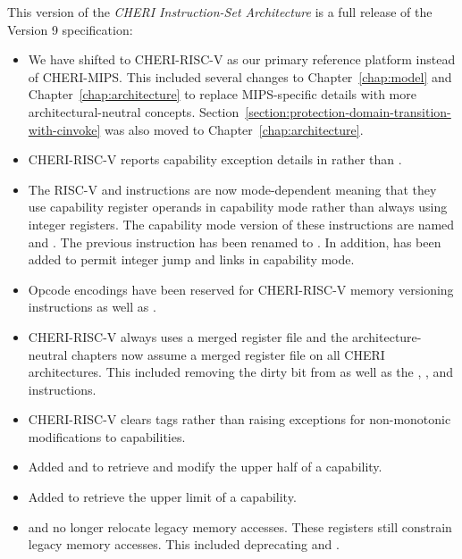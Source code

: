 This version of the \textit{CHERI Instruction-Set Architecture} is a full
release of the Version 9 specification:

\begin{itemize}
\item We have shifted to CHERI-RISC-V as our primary reference
  platform instead of CHERI-MIPS.  This included several changes to
  Chapter~\ref{chap:model} and Chapter~\ref{chap:architecture} to
  replace MIPS-specific details with more architectural-neutral
  concepts.
  Section~\ref{section:protection-domain-transition-with-cinvoke} was
  also moved to Chapter~\ref{chap:architecture}.

\item CHERI-RISC-V reports capability exception details in \xtval{}
  rather than \xccsr{}.

\item The RISC-V  and  instructions are
  now mode-dependent meaning that they use capability register
  operands in capability mode rather than always using integer
  registers.  The capability mode version of these instructions are
  named  and .  The previous
   instruction has been renamed to
  .  In addition,  has been added
  to permit integer jump and links in capability mode.

\item Opcode encodings have been reserved for CHERI-RISC-V memory
  versioning instructions as well as .

\item CHERI-RISC-V always uses a merged register file and the
  architecture-neutral chapters now assume a merged register file on
  all CHERI architectures.  This included removing the dirty bit from
  \xccsr{} as well as the , , and
   instructions.

\item CHERI-RISC-V clears tags rather than raising exceptions for
  non-monotonic modifications to capabilities.

\item Added  and  to retrieve and
  modify the upper half of a capability.

\item Added  to retrieve the upper limit of a
  capability.

\item \DDC{} and \PCC{} no longer relocate legacy memory accesses.
  These registers still constrain legacy memory accesses.  This
  included deprecating  and .


\end{itemize}
